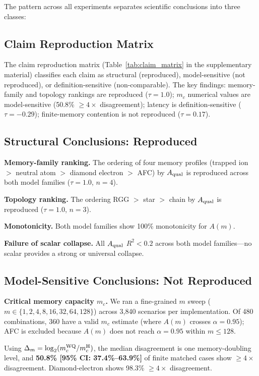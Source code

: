 \documentclass{ams-journal}
\newcommand{\Aqual}{A_{\rm qual}}
\begin{document}
The pattern across all experiments separates scientific conclusions into three classes:

\subsection{Claim Reproduction Matrix}

The claim reproduction matrix (Table~\ref{tab:claim_matrix} in the supplementary material) classifies each claim as structural (reproduced), model-sensitive (not reproduced), or definition-sensitive (non-comparable). The key findings: memory-family and topology rankings are reproduced ($\tau = 1.0$); $m_c$ numerical values are model-sensitive (50.8\% $\geq 4\times$ disagreement); latency is definition-sensitive ($\tau = -0.29$); finite-memory contention is not reproduced ($\tau = 0.17$).

\subsection{Structural Conclusions: Reproduced}

\textbf{Memory-family ranking.} The ordering of four memory profiles (trapped ion $>$ neutral atom $>$ diamond electron $>$ AFC) by $\Aqual$ is reproduced across both model families ($\tau = 1.0$, $n = 4$).

\textbf{Topology ranking.} The ordering RGG $>$ star $>$ chain by $\Aqual$ is reproduced ($\tau = 1.0$, $n = 3$).

\textbf{Monotonicity.} Both model families show 100\% monotonicity for $A(m)$.

\textbf{Failure of scalar collapse.} All $\Aqual$ $R^2 < 0.2$ across both model families---no scalar provides a strong or universal collapse.

\subsection{Model-Sensitive Conclusions: Not Reproduced}

\textbf{Critical memory capacity $m_c$.} We ran a fine-grained $m$ sweep ($m \in \{1, 2, 4, 8, 16, 32, 64, 128\}$) across 3,840 scenarios per implementation. Of 480 combinations, 360 have a valid $m_c$ estimate (where $A(m)$ crosses $\alpha = 0.95$); AFC is excluded because $A(m)$ does not reach $\alpha = 0.95$ within $m \leq 128$.

Using $\Delta_m = \log_2(m_c^{\rm WQ} / m_c^{\rm H})$, the median disagreement is one memory-doubling level, and \textbf{50.8\% [95\% CI: 37.4\%--63.9\%]} of finite matched cases show $\geq 4\times$ disagreement. Diamond-electron shows 98.3\% $\geq 4\times$ disagreement.
\end{document}
